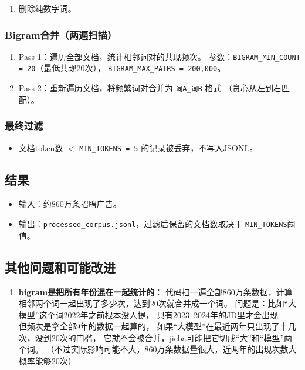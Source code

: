 \documentclass[12pt,a4paper]{ctexart}
\begin{document}
\begin{enumerate}
\textbf{准备修改}
默认保留所有长度$\geq 2$的英文词，
仅用一个小黑名单排除HTML标签残留（br, div, nbsp, li, span, font, img, href, style, color, margin, padding等）
和英文虚词（and, the, in, to, of, or, with, for, is, are, be, an, at, by, on, as, it, we, do, if, no等）。
对单字母仅保留 c 和 r（编程语言）。
其余噪声交给 LDA 的 \texttt{min\_cf} 和 \texttt{rm\_top} 自动过滤。

\item 删除纯数字词。
\end{enumerate}

\subsubsection{Bigram合并（两遍扫描）}
\begin{enumerate}
\item Pass 1：遍历全部文档，统计相邻词对的共现频次。
参数：\texttt{BIGRAM\_MIN\_COUNT = 20}（最低共现20次），
\texttt{BIGRAM\_MAX\_PAIRS = 200,000}。
\item Pass 2：重新遍历文档，将频繁词对合并为 \texttt{词A\_词B} 格式
（贪心从左到右匹配）。
\end{enumerate}

\subsubsection{最终过滤}
\begin{itemize}
\item 文档token数 $<$ \texttt{MIN\_TOKENS = 5} 的记录被丢弃，不写入JSONL。
\end{itemize}

\subsection{结果}
\begin{itemize}
\item 输入：约860万条招聘广告。
\item 输出：\texttt{processed\_corpus.jsonl}，过滤后保留的文档数取决于
\texttt{MIN\_TOKENS}阈值。
\end{itemize}

\subsection{其他问题和可能改进}
\begin{enumerate}
\item \textbf{bigram是把所有年份混在一起统计的}：
代码扫一遍全部860万条数据，计算相邻两个词一起出现了多少次，达到20次就合并成一个词。
问题是：比如``大模型''这个词2022年之前根本没人提，
只有2023--2024年的JD里才会出现——
但频次是拿全部9年的数据一起算的，
如果``大模型''在最近两年只出现了十几次，没到20次的门槛，
它就不会被合并，jieba可能把它切成``大''和``模型''两个词。
（不过实际影响可能不大，860万条数据量很大，近两年的出现次数大概率能够20次）
\end{enumerate}
\end{document}
